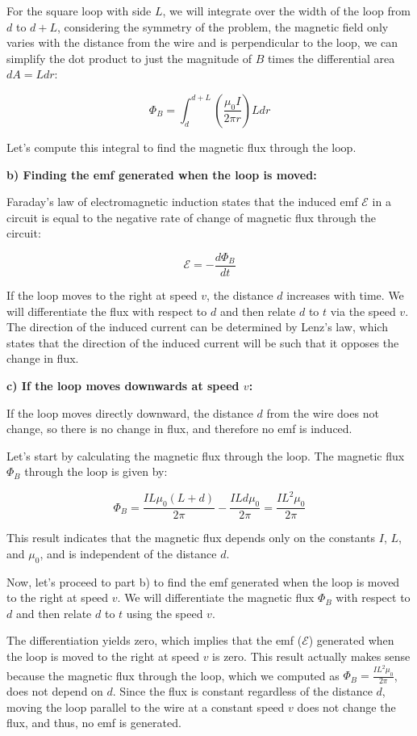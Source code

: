 \documentclass[a4paper,11pt]{article}
\begin{document}
For the square loop with side $L$, we will integrate over the width of the loop from $d$ to $d+L$, considering the symmetry of the problem, the magnetic field only varies with the distance from the wire and is perpendicular to the loop, we can simplify the dot product to just the magnitude of $B$ times the differential area $dA = L dr$:

\[
\Phi_B = \int_{d}^{d+L} \left(\frac{\mu_0 I}{2\pi r}\right) L dr
\]

Let's compute this integral to find the magnetic flux through the loop.

\textbf{b) Finding the emf generated when the loop is moved:}

Faraday's law of electromagnetic induction states that the induced emf $\mathcal{E}$ in a circuit is equal to the negative rate of change of magnetic flux through the circuit:

\[
\mathcal{E} = - \frac{d\Phi_B}{dt}
\]

If the loop moves to the right at speed $v$, the distance $d$ increases with time. We will differentiate the flux with respect to $d$ and then relate $d$ to $t$ via the speed $v$. The direction of the induced current can be determined by Lenz's law, which states that the direction of the induced current will be such that it opposes the change in flux.

\textbf{c) If the loop moves downwards at speed $v$:}

If the loop moves directly downward, the distance $d$ from the wire does not change, so there is no change in flux, and therefore no emf is induced.

Let's start by calculating the magnetic flux through the loop. The magnetic flux $\Phi_B$ through the loop is given by:

\[
\Phi_B = \frac{I L \mu_0 (L + d)}{2 \pi} - \frac{I L d \mu_0}{2 \pi} = \frac{I L^2 \mu_0}{2 \pi}
\]

This result indicates that the magnetic flux depends only on the constants $I$, $L$, and $\mu_0$, and is independent of the distance $d$.

Now, let's proceed to part b) to find the emf generated when the loop is moved to the right at speed $v$. We will differentiate the magnetic flux $\Phi_B$ with respect to $d$ and then relate $d$ to $t$ using the speed $v$.

The differentiation yields zero, which implies that the emf ($\mathcal{E}$) generated when the loop is moved to the right at speed $v$ is zero. This result actually makes sense because the magnetic flux through the loop, which we computed as $\Phi_B = \frac{I L^2 \mu_0}{2 \pi}$, does not depend on $d$. Since the flux is constant regardless of the distance $d$, moving the loop parallel to the wire at a constant speed $v$ does not change the flux, and thus, no emf is generated.
\end{document}
